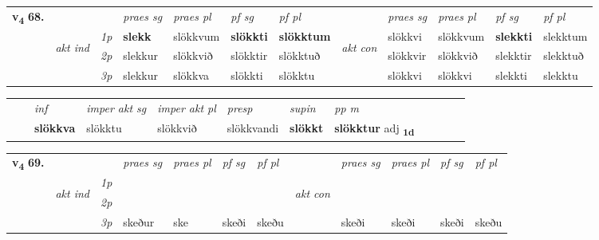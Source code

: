 \begin{tabular}{llllllllllll} \toprule
\multirow{4}{*}{{{\textbf{v{\textsubscript{4}}} \Large{\textbf{68.}}}}}  & &   &  \textit{praes sg}  & \textit{praes pl}  &\textit{ pf sg} & \textit{pf pl} &  &  \textit{praes sg}  & \textit{praes pl}  & \textit{pf sg} & \textit{pf pl } \\*
	\cmidrule{4-7} \cmidrule{9-12}
 & \multirow{3}{*}{\begin{turn}{90}\textit{akt ind}\end{turn}} & {\textit{1p}} & \textbf{slekk} & slökkvum    & \textbf{slökkti} & \textbf{slökktum} & \multirow{3}{*}{\begin{turn}{90}\textit{akt con}\end{turn}} &slökkvi & slökkvum & \textbf{slekkti} & slekktum\\*
& &  {\textit{2p}} &  slekkur  & slökkvið   & slökktir & slökktuð & & slökkvir & slökkvið & slekktir & slekktuð \\*
& &  {\textit{3p}} & slekkur & slökkva   & slökkti & slökktu & & slökkvi & slökkvi& slekkti & slekktu  \\*
\cmidrule{4-7} \cmidrule{9-12}
\end{tabular}


\begin{tabular}{llllllllllll}
 & & \textit{inf} & \textit{imper akt sg} & \textit{imper akt pl}   & \textit{presp} & \textit{supin}  & \textit{pp m}     \\*
  & & \textbf{slökkva} & slökktu  & slökkvið   & slökkvandi &  \textbf{slökkt}  & \textbf{slökktur} adj \textbf{\textsubscript{1d}} \\*
\cmidrule{1-12}
\end{tabular}



\begin{tabular}{llllllllllll} \toprule
\multirow{4}{*}{{{\textbf{v{\textsubscript{4}}} \Large{\textbf{69.}}}}}  & &   &  \textit{praes sg}  & \textit{praes pl}  &\textit{ pf sg} & \textit{pf pl} &  &  \textit{praes sg}  & \textit{praes pl}  & \textit{pf sg} & \textit{pf pl } \\*
	\cmidrule{4-7} \cmidrule{9-12}
 & \multirow{3}{*}{\begin{turn}{90}\textit{akt ind}\end{turn}} & {\textit{1p}} & \textbf{} &     & \textbf{} & \textbf{} & \multirow{3}{*}{\begin{turn}{90}\textit{akt con}\end{turn}} & &  & \textbf{} & \\*
& &  {\textit{2p}} &    &    &  &  & &  &  &  &  \\*
& &  {\textit{3p}} & skeður & ske   & skeði & skeðu & & skeði & skeði& skeði & skeðu  \\*
\cmidrule{4-7} \cmidrule{9-12}
\end{tabular}


